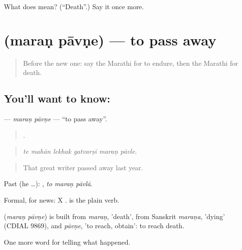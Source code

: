 \begin{tcolorbox}[breakable,colback=teal!4,colframe=teal!35!black,title={Before you move on}]
What does  mean? (\textquotedblleft{}Death\textquotedblright{}.) Say it once more.
\end{tcolorbox}
\section[\texorpdfstring{\mr{मरण} \mr{पावणे} (maraṇ pāvṇe)}{मरण पावणे (maraṇ pāvṇe)}]{  (maraṇ pāvṇe) — to pass away}

\label{lesson:MR-C309-maran-pavne}



\begin{quote}
Before the new one: say the Marathi for to endure, then the Marathi for death.
\end{quote}

\subsection*{You'll want to know:  }
\textbf{ } — \emph{maraṇ pāvṇe} — \textquotedblleft{}to pass away\textquotedblright{}.

\begin{quote}
     .
\end{quote}

\begin{quote}
\emph{te mahān lekhak gatvarṣī maraṇ pāvle.}
\end{quote}

\begin{quote}
That great writer passed away last year.
\end{quote}

Past (he …):   , \emph{to maraṇ pāvlā}.

Formal, for news: X  .  is the plain verb.

\begin{cousinweb}
\textbf{ } (\emph{maraṇ pāvṇe}) is built from \emph{maraṇ}, 'death', from Sanskrit \emph{maraṇa}, 'dying' (CDIAL 9869), and \emph{pāvṇe}, 'to reach, obtain': to reach death.
\end{cousinweb}

\begin{grammarlens}[title={What you've built}]
One more word for telling what happened.
\end{grammarlens}

